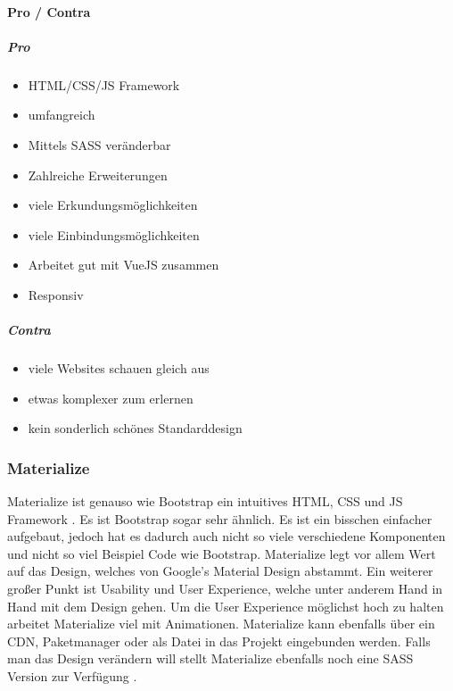 		\paragraph{Pro / Contra}
		\subparagraph{Pro}
		\begin{itemize}
			\item HTML/CSS/JS Framework
			\item umfangreich
			\item Mittels SASS veränderbar
			\item Zahlreiche Erweiterungen
			\item viele Erkundungsmöglichkeiten
			\item viele Einbindungsmöglichkeiten
			\item Arbeitet gut mit VueJS zusammen
			\item Responsiv
		\end{itemize}
		\subparagraph{Contra}
		\begin{itemize}
			\item viele Websites schauen gleich aus
			\item etwas komplexer zum erlernen
			\item kein sonderlich schönes Standarddesign
		\end{itemize}
	
		\subsubsection{Materialize}
		Materialize ist genauso wie Bootstrap ein intuitives HTML, CSS und JS Framework \cite{materialize-intro}. Es ist Bootstrap sogar sehr ähnlich. Es ist ein bisschen einfacher aufgebaut, jedoch hat es dadurch auch nicht so viele verschiedene Komponenten und nicht so viel Beispiel Code wie Bootstrap. Materialize legt vor allem Wert auf das Design, welches von Google's Material Design abstammt. Ein weiterer großer Punkt ist Usability und User Experience, welche unter anderem Hand in Hand mit dem Design gehen. Um die User Experience möglichst hoch zu halten arbeitet Materialize viel mit Animationen. Materialize kann ebenfalls über ein CDN, Paketmanager oder als Datei in das Projekt eingebunden werden. Falls man das Design verändern will stellt Materialize ebenfalls noch eine SASS Version zur Verfügung \cite{materialize-docu}.
